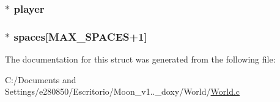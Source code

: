 \hypertarget{struct___world_a96781128d3743da3d17e0fdd91afba7b}{
\subsubsection[{player}]{$\ast$ player}}\label{struct___world_a96781128d3743da3d17e0fdd91afba7b}
\hypertarget{struct___world_accfe91baa7a309d2673669de3a32d1dd}{
\subsubsection[{spaces}]{$\ast$ spaces\mbox{[}{\bf M\+A\+X\+\_\+\+S\+P\+A\+C\+E\+S}+1\mbox{]}}}\label{struct___world_accfe91baa7a309d2673669de3a32d1dd}


The documentation for this struct was generated from the following file\+:\begin{DoxyCompactItemize}
\item 
C\+:/\+Documents and Settings/e280850/\+Escritorio/\+Moon\+\_\+v1..\+\_\+doxy/\+World/\hyperlink{_world_8c}{World.\+c}\end{DoxyCompactItemize}
